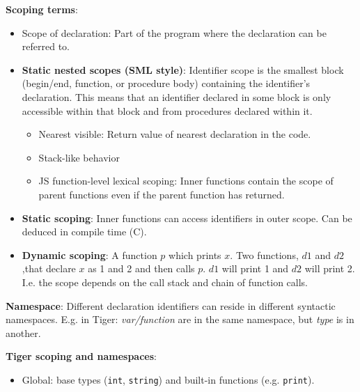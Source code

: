 \textbf{Scoping terms}:

\begin{itemize}
    \item Scope of declaration: Part of the program where the declaration can be referred to.
    \item \textbf{Static nested scopes (SML style)}: Identifier scope is the smallest block (begin/end, function, or procedure body) containing the identifier's declaration. This means that an identifier declared in some block is only accessible within that block and from procedures declared within it.
    \begin{itemize}
        \item Nearest visible: Return value of nearest declaration in the code.
        \item Stack-like behavior
        \item JS function-level lexical scoping: Inner functions contain the scope of parent functions even if the parent function has returned.
    \end{itemize}
    \item \textbf{Static scoping}: Inner functions can access identifiers in outer scope. Can be deduced in compile time (C).
    \item \textbf{Dynamic scoping}: A function $p$ which prints $x$. Two functions, $d1$ and $d2$,that declare $x$ as 1 and 2 and then calls $p$. $d1$ will print 1 and $d2$ will print 2. I.e. the scope depends on the call stack and chain of function calls.
\end{itemize}

\textbf{Namespace}: Different declaration identifiers can reside in different syntactic namespaces. E.g. in Tiger: \textit{var/function} are in the same namespace, but \textit{type} is in another.

\textbf{Tiger scoping and namespaces}:
\begin{itemize}
    \item Global: base types (\texttt{int}, \texttt{string}) and built-in functions (e.g. \texttt{print}).
\end{itemize}


